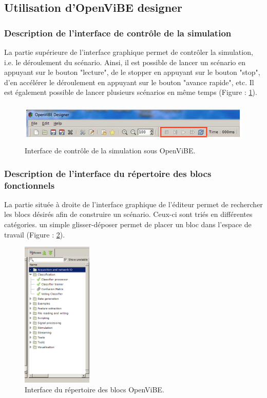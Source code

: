 \subsection{Utilisation d'OpenViBE designer}
\label{Subsection :5.Utilisation d'OpenViBE designer}

\subsubsection{Description de l'interface de contrôle de la simulation}
\label{Subsubsection : 5.Description de l'interface de contrôle de la simulation}
La partie supérieure de l'interface graphique permet de contrôler la simulation, i.e. le déroulement du scénario. Ainsi, il est possible de lancer un scénario en appuyant sur le bouton "lecture", de le stopper en appuyant sur le bouton "stop", d'en accélérer le déroulement en appuyant sur le bouton "avance rapide", etc. Il est également possible de lancer plusieurs scénarios en même temps (Figure : \ref{fig:interface_simu_ov}). 

\begin{figure}[h]
	\centering\includegraphics[height=2cm]{images/interface_simu_ov.png}
	\caption{Interface de contrôle de la simulation sous OpenViBE.}
	\label{fig:interface_simu_ov}
\end{figure}

\subsubsection{Description de l'interface du répertoire des blocs fonctionnels}
\label{Subsubsection : 5.Description de l'interface du répertoire de blocs fonctionnels}
La partie située à droite de l'interface graphique de l'éditeur permet de rechercher les blocs désirés afin de construire un scénario. Ceux-ci sont triés en différentes catégories. un simple glisser-déposer permet de placer un bloc dans l'espace de travail (Figure : \ref{fig:interface_bloc_ov}).

\begin{figure}[h]
	\centering\includegraphics[height=7cm]{images/interface_bloc_ov.png}
	\caption{Interface du répertoire des blocs OpenViBE.}
	\label{fig:interface_bloc_ov}
\end{figure}

